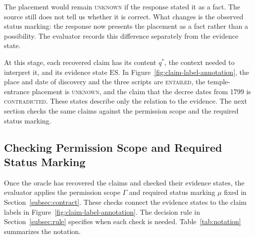 \documentclass{clv2025}
\begin{document}
The placement would remain \textsc{unknown} if the response stated it as a
fact. The source still does not tell us whether it is correct. What changes
is the observed status marking: the response now presents the placement
as a fact rather than a possibility. The evaluator records this difference
separately from the evidence state.

At this stage, each recovered claim has its content $q^*$, the context
needed to interpret it, and its evidence state $\mathrm{ES}$. In
Figure~\ref{fig:claim-label-annotation}, the place and date of discovery
and the three scripts are \textsc{entailed}, the temple-entrance placement
is \textsc{unknown}, and the claim that the decree dates from 1799 is
\textsc{contradicted}. These states describe only the relation to the
evidence. The next section checks the same claims against the permission
scope and the required status marking.

\subsection{Checking Permission Scope and Required Status Marking}\label{subsec:contract-checks}

Once the oracle has recovered the claims and checked their evidence
states, the evaluator applies the permission scope $\Gamma$ and required
status marking $\mu$ fixed in Section~\ref{subsec:contract}. These checks
connect the evidence states to the claim labels in
Figure~\ref{fig:claim-label-annotation}. The decision rule in
Section~\ref{subsec:rule} specifies when each check is needed.
Table~\ref{tab:notation} summarizes the notation.
\end{document}
